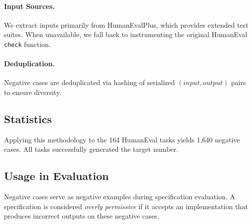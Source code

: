 \paragraph{Input Sources.} We extract inputs primarily from HumanEvalPlus, which provides extended test suites. When unavailable, we fall back to instrumenting the original HumanEval \texttt{check} function.

\paragraph{Deduplication.} Negative cases are deduplicated via hashing of serialized $(input, output)$ pairs to ensure diversity.

\subsection{Statistics}

Applying this methodology to the 164 HumanEval tasks yields 1,640 negative cases. All tasks successfully generated the target number.

\subsection{Usage in Evaluation}

Negative cases serve as negative examples during specification evaluation. A specification is considered \emph{overly permissive} if it accepts an implementation that produces incorrect outputs on these negative cases.
